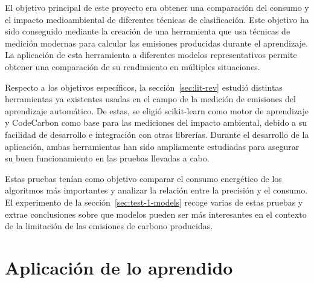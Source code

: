 El objetivo principal de este proyecto era obtener una comparación del consumo y el impacto medioambiental de diferentes técnicas de clasificación. Este objetivo ha sido conseguido mediante la creación de una herramienta que usa técnicas de medición modernas para calcular las emisiones producidas durante el aprendizaje. La aplicación de esta herramienta a diferentes modelos representativos permite obtener una comparación de su rendimiento en múltiples situaciones.

Respecto a los objetivos específicos, la sección~\ref{sec:lit-rev} estudió distintas herramientas ya existentes usadas en el campo de la medición de emisiones del aprendizaje automático. De estas, se eligió scikit-learn como motor de aprendizaje y CodeCarbon como base para las mediciones del impacto ambiental, debido a su facilidad de desarrollo e integración con otras librerías. Durante el desarrollo de la aplicación, ambas herramientas han sido ampliamente estudiadas para asegurar su buen funcionamiento en las pruebas llevadas a cabo.

Estas pruebas tenían como objetivo comparar el consumo energético de los algoritmos más importantes y analizar la relación entre la precisión y el consumo. El experimento de la sección~\ref{sec:test-1-models} recoge varias de estas pruebas y extrae conclusiones sobre que modelos pueden ser más interesantes en el contexto de la limitación de las emisiones de carbono producidas.

\section{Aplicación de lo aprendido}
\label{sec:aplicacion}

